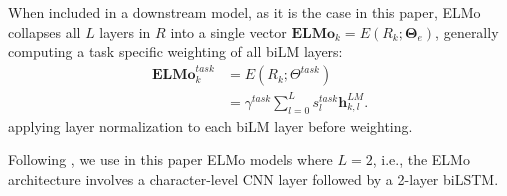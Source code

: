 When included in a downstream model, as it is the case in this paper, ELMo collapses all $L$ layers in $R$ into a single vector $\mathbf{ELMo}_k = E(R_k; \mathbf{\Theta}_e)$, generally computing a task specific weighting of all biLM layers:
\begin{align*}
    \mathbf{ELMo}^{task}_k & = E(R_k; \Theta^{task})                                       \\
                           & =\gamma^{task} \sum_{l=0}^L s^{task}_l \mathbf{h}^{LM}_{k,l}.
\end{align*}
applying layer normalization to each biLM layer before weighting.

Following \cite{peters-etal-2018-deep}, we use in this paper ELMo models where $L=2$, i.e., the ELMo architecture involves a character-level CNN layer followed by a 2-layer biLSTM.

